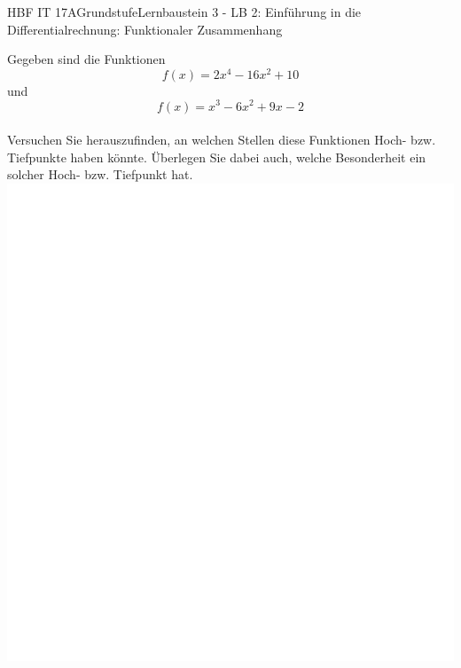 \documentclass[oneside,openany,headings=optiontotoc,11pt,numbers=noenddot]{scrreprt}
\begin{document}
	\begin{worksheet}{HBF IT 17A}{Grundstufe}{Lernbaustein 3 - LB 2: Einführung in die Differentialrechnung: Funktionaler Zusammenhang}

		\begin{framed}
			\noindent
			Gegeben sind die Funktionen \[f(x) = 2x^4 -16x^2+10\] und \[f(x) = x^3 -6x^2 +9x -2\]\\
			Versuchen Sie herauszufinden, an welchen Stellen diese Funktionen Hoch- bzw. Tiefpunkte haben könnte. Überlegen Sie dabei auch, welche Besonderheit ein solcher Hoch- bzw. Tiefpunkt hat.\\
			\includegraphics[scale=0.7]{../empty.jpg}\\

\end{framed}
\end{worksheet}
\end{document}
